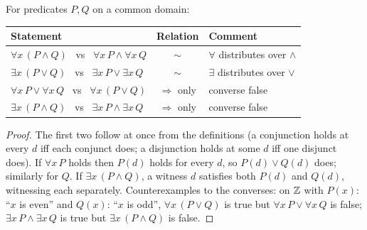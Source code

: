 \begin{theorem}\label{thm:qconn}
	For predicates $P,Q$ on a common domain:
	\begin{center}
		\begin{tabular}{@{}p{6cm}cp{5.6cm}@{}}
			\toprule
			\textbf{Statement} & \textbf{Relation} & \textbf{Comment}\\
			\midrule
			$\forall x\,(P\wedge Q)$ \ vs \ $\forall x\,P\wedge\forall x\,Q$ & $\sim$ & $\forall$ distributes over $\wedge$\\
			$\exists x\,(P\vee Q)$ \ vs \ $\exists x\,P\vee\exists x\,Q$ & $\sim$ & $\exists$ distributes over $\vee$\\
			$\forall x\,P\vee\forall x\,Q$ \ vs \ $\forall x\,(P\vee Q)$ & $\Rightarrow$ only & converse false\\
			$\exists x\,(P\wedge Q)$ \ vs \ $\exists x\,P\wedge\exists x\,Q$ & $\Rightarrow$ only & converse false\\
			\bottomrule
		\end{tabular}
	\end{center}
\end{theorem}
\begin{proof}
	The first two follow at once from the definitions (a conjunction holds at every $d$ iff each conjunct does; a disjunction holds at some $d$ iff one disjunct does). If $\forall x\,P$ holds then $P(d)$ holds for every $d$, so $P(d)\vee Q(d)$ does; similarly for $Q$. If $\exists x\,(P\wedge Q)$, a witness $d$ satisfies both $P(d)$ and $Q(d)$, witnessing each separately. Counterexamples to the converses: on $\mathbb{Z}$ with $P(x)$: ``$x$ is even'' and $Q(x)$: ``$x$ is odd'', $\forall x\,(P\vee Q)$ is true but $\forall x\,P\vee\forall x\,Q$ is false; $\exists x\,P\wedge\exists x\,Q$ is true but $\exists x\,(P\wedge Q)$ is false.
\end{proof}